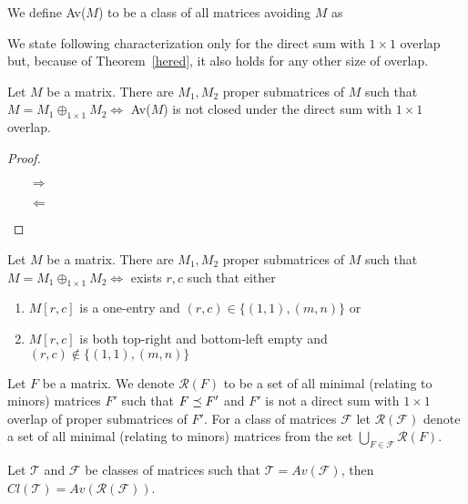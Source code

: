 \begin{ntn}
We define Av($M$) to be a class of all matrices avoiding $M$ as 
\end{ntn}
We state following characterization only for the direct sum with $1\times1$ overlap but, because of Theorem~\ref{hered}, it also holds for any other size of overlap.
\begin{thm}
Let $M$ be a matrix. There are $M_1,M_2$ proper submatrices of $M$ such that $M=M_1\oplus_{1\times1}M_2\Leftrightarrow$ Av($M$) is not closed under the direct sum with $1\times1$ overlap.
\end{thm}
\begin{proof}
\begin{itemize}
\item[$\Rightarrow$]
\item[$\Leftarrow$]
\end{itemize}
\end{proof}
\begin{obs}
\label{obsart}
Let $M$ be a matrix. There are $M_1,M_2$ proper submatrices of $M$ such that $M=M_1\oplus_{1\times1}M_2\Leftrightarrow$ exists $r,c$ such that either
\begin{enumerate}
\item $M[r,c]$ is a one-entry and $(r,c)\in\{(1,1),(m,n)\}$ or
\item $M[r,c]$ is both top-right and bottom-left empty and $(r,c)\not\in\{(1,1),(m,n)\}$
\end{enumerate}
\end{obs}
\begin{defn}
Let $F$ be a matrix. We denote $\mathcal{R}(F)$ to be a set of all minimal (relating to minors) matrices $F'$ such that $F\preceq F'$ and $F'$ is not a direct sum with $1\times1$ overlap of proper submatrices of $F'$. For a class of matrices $\mathcal{F}$ let $\mathcal{R}(\mathcal{F})$ denote a set of all minimal (relating to minors) matrices from the set $\bigcup_{F\in\mathcal{F}}\mathcal{R}(F)$.
\end{defn}
\begin{thm}
\label{thmbasis}
Let $\mathcal{T}$ and $\mathcal{F}$ be classes of matrices such that $\mathcal{T}=Av(\mathcal{F})$, then $Cl(\mathcal{T})=Av(\mathcal{R}(\mathcal{F}))$.
\end{thm}
